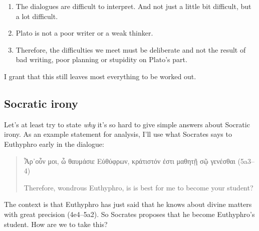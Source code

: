 \documentclass[11pt]{article}
\begin{document}
\begin{enumerate}
    \item The dialogues are difficult to interpret.  And not just a little bit difficult, but a lot difficult.
    \item Plato is not a poor writer or a weak thinker.
    \item Therefore, the difficulties we meet must be deliberate and not the result of bad writing, poor planning or stupidity on Plato's part.
\end{enumerate}

I grant that this still leaves most everything to be worked out.

\subsection{Socratic irony}

Let's at least try to state \emph{why} it's so hard to give simple answers about Socratic irony.  As an example statement for analysis, I'll use what Socrates says to Euthyphro early in the dialogue:

\begin{quote}
    Ἆρ᾽οὖν μοι, ὦ θαυμάσιε Εὐθύφρων, κράτιστόν ἐστι μαθητῇ σῷ γενέσθαι (5a3--4)

    Therefore, wondrous Euthyphro, is is best for me to become your student?
\end{quote}

The context is that Euthyphro has just said that he knows about divine matters with great precision (4e4--5a2).  So Socrates proposes that he become Euthyphro's student.  How are we to take this?
\end{document}
